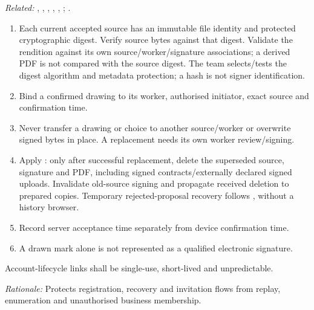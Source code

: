 \textit{Related:} \hyperref[fr:038]{}, \hyperref[fr:041]{}, \hyperref[fr:042]{}, \hyperref[fr:043]{}, \hyperref[fr:044]{}, \hyperref[fr:045]{}; \hyperref[br:026]{}.
\begin{enumerate}[label=(\alph*),leftmargin=*,itemsep=1pt,topsep=3pt]
\item Each current accepted source has an immutable file identity and protected cryptographic digest. Verify source bytes against that digest. Validate the rendition against its own source/worker/signature associations; a derived PDF is not compared with the source digest. The team selects/tests the digest algorithm and metadata protection; a hash is not signer identification.
\item Bind a confirmed drawing to its worker, authorised initiator, exact source and confirmation time.
\item Never transfer a drawing or choice to another source/worker or overwrite signed bytes in place. A replacement needs its own worker review/signing.
\item Apply : only after successful replacement, delete the superseded source, signature and PDF, including signed contracts/externally declared signed uploads. Invalidate old-source signing and propagate received deletion to prepared copies. Temporary rejected-proposal recovery follows , without a history browser.
\item Record server acceptance time separately from device confirmation time.
\item A drawn mark alone is not represented as a qualified electronic signature.
\end{enumerate}

\label{nfr:SEC-09}
Account-lifecycle links shall be single-use, short-lived and unpredictable.

\textit{Rationale:} Protects registration, recovery and invitation flows from replay, enumeration and unauthorised business membership.

